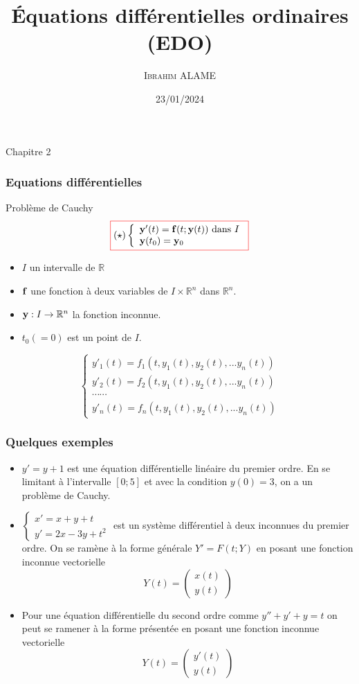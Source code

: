 \documentclass{beamer}
\title{Équations différentielles  ordinaires (EDO)}
\author{ \textsc{Ibrahim ALAME}}\institute{ESTP}
\date{23/01/2024}
\newcommand{\myredbox}[1]{\fcolorbox{red}{white}{$\displaystyle#1$}}
\begin{document}
 \begin{frame}
 \begin{center}
 Chapitre 2
 \end{center}
  \titlepage
  \end{frame}

 \begin{frame}
  \frametitle{Equations différentielles}
  \begin{block}{Problème de Cauchy}
  \[\myredbox{(\star)\left\{\begin{array}{l}
{\bf y}'(t) = {\bf f}(t; {\bf y}(t)) \mbox{ dans }I\\
{\bf y}(t_0) = {\bf y}_0
\end{array}\right.
}\]
\begin{itemize}
\item  $I$ un intervalle de $\mathbb{R}$
\item ${\bf f}$ une fonction à deux variables de $I\times \mathbb{R}^n$ dans $\mathbb{R}^n$. 
\item ${\bf y}:I\to \mathbb{R}^n$ la fonction inconnue.
\item $t_0(=0)$ est un point de $I$. 
\end{itemize}
  \end{block}
  \[\left\{\begin{array}{l}
  y'_1(t)=f_1(t,y_1(t),y_2(t),...y_n(t))\\
  y'_2(t)=f_2(t,y_1(t),y_2(t),...y_n(t))\\
  \cdots\cdots \\
  y'_n(t)=f_n(t,y_1(t),y_2(t),...y_n(t))
  \end{array}\right.\]


  \end{frame}
  
   \begin{frame}
  \frametitle{Quelques exemples}
  
\begin{itemize}
\item  $y' = y + 1$ est une équation différentielle linéaire du premier
ordre. En se limitant à l'intervalle $[0; 5]$ et avec la condition
$y(0) = 3$, on a un problème de Cauchy.
\item $\left\{\begin{array}{l}
x' = x + y + t\\
y' = 2x - 3y + t^2
\end{array} \right.$
 est un système différentiel à deux inconnues du premier ordre. On se ramène à la forme générale $Y' = F(t; Y)$ en posant une fonction inconnue vectorielle
\[Y (t) =\left(\begin{array}{l}
x(t)\\
y(t)
\end{array} \right)\]
\item Pour une équation différentielle du second ordre comme $y'' + y' + y = t $ on peut se ramener à la forme présentée en posant une fonction inconnue vectorielle 
\[Y (t) =\left(\begin{array}{l}
y'(t)\\
y(t)
\end{array} \right)\]
\end{itemize}
 
  \end{frame}
  
\end{document}
